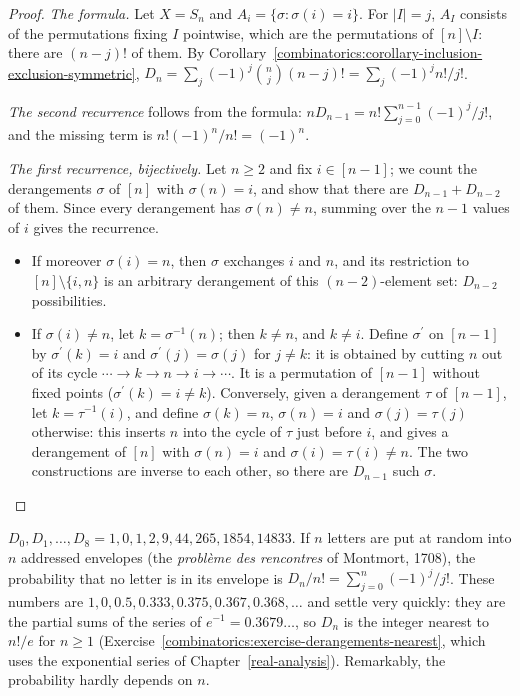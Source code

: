 \begin{proof}
\emph{The formula.} Let $X = S_n$ and $A_i = \{\sigma : \sigma(i) = i\}$. For $|I| = j$, $A_I$ consists of the permutations fixing $I$ pointwise, which are the permutations of $[n] \setminus I$: there
are $(n - j)!$ of them. By Corollary~\ref{combinatorics:corollary-inclusion-exclusion-symmetric},
$D_n = \sum_j(-1)^j\binom{n}{j}(n - j)! = \sum_j(-1)^jn!/j!$.

\emph{The second recurrence} follows from the formula: $nD_{n-1} = n!\sum_{j=0}^{n-1}(-1)^j/j!$, and the missing term is $n!(-1)^n/n! = (-1)^n$.

\emph{The first recurrence, bijectively.} Let $n \geq 2$ and fix $i \in [n - 1]$; we count the derangements $\sigma$ of $[n]$ with $\sigma(n) = i$, and show that there are $D_{n-1} + D_{n-2}$ of
them. Since every derangement has $\sigma(n) \neq n$, summing over the $n - 1$ values of $i$ gives the recurrence.
\begin{itemize}
\item If moreover $\sigma(i) = n$, then $\sigma$ exchanges $i$ and $n$, and its restriction to $[n] \setminus \{i, n\}$ is an arbitrary derangement of this $(n - 2)$-element set: $D_{n-2}$ possibilities.
\item If $\sigma(i) \neq n$, let $k = \sigma^{-1}(n)$; then $k \neq n$, and $k \neq i$. Define $\sigma^{\prime}$ on $[n - 1]$ by $\sigma^{\prime}(k) = i$ and $\sigma^{\prime}(j) = \sigma(j)$ for $j \neq k$:
it is obtained by cutting $n$ out of its cycle $\cdots \to k \to n \to i \to \cdots$. It is a permutation of $[n - 1]$ without fixed points ($\sigma^{\prime}(k) = i \neq k$). Conversely, given a
derangement $\tau$ of $[n - 1]$, let $k = \tau^{-1}(i)$, and define $\sigma(k) = n$, $\sigma(n) = i$ and $\sigma(j) = \tau(j)$ otherwise: this inserts $n$ into the cycle of $\tau$ just before $i$, and
gives a derangement of $[n]$ with $\sigma(n) = i$ and $\sigma(i) = \tau(i) \neq n$. The two constructions are inverse to each other, so there are $D_{n-1}$ such $\sigma$.
\end{itemize}
\end{proof}

\begin{example}\label{combinatorics:example-derangements}
$D_0, D_1, \ldots, D_8 = 1, 0, 1, 2, 9, 44, 265, 1854, 14833$. If $n$ letters are put at random into $n$ addressed envelopes (the \emph{probl\`eme des rencontres} of Montmort, 1708), the probability that
no letter is in its envelope is $D_n/n! = \sum_{j=0}^{n}(-1)^j/j!$. These numbers are $1, 0, 0.5, 0.333, 0.375, 0.367, 0.368, \ldots$ and settle very quickly: they are the partial sums of the series of
$e^{-1} = 0.3679\ldots$, so $D_n$ is the integer nearest to $n!/e$ for $n \geq 1$ (Exercise~\ref{combinatorics:exercise-derangements-nearest}, which uses the exponential series of
Chapter~\ref{real-analysis}). Remarkably, the probability hardly depends on $n$.
\end{example}


